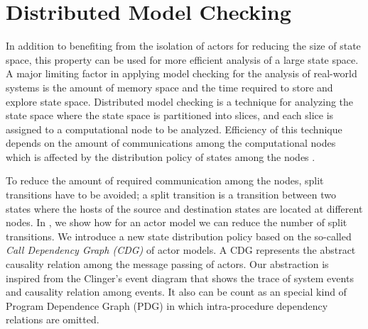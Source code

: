 \section{Distributed Model Checking} \label{sec::DMC}
In addition to benefiting from the isolation of actors for reducing the size of state space, this property can be used for more efficient analysis of a large state space. A major limiting factor in applying model checking for the analysis of real-world systems is the amount of memory space and the time required to store and explore state space. Distributed model checking is a technique for analyzing the state space
where the state space is partitioned into slices, and each slice is assigned to a computational node to be analyzed. Efficiency of this technique depends on the %
amount of communications among the computational nodes which is affected by the distribution policy of states among the nodes \cite{DBLP:journals/entcs/OrzanPE05}. 

To reduce the 
amount of required communication among the nodes, split transitions have to be avoided; a split transition is a transition between two states where the hosts of the source and destination states are located at different nodes. In \cite{DBLP:journals/eceasst/KhamespanahSMSR15}, we show how
for an actor model we can
reduce the number of split transitions. We introduce a new state distribution policy based on the so-called \textit{Call Dependency Graph (CDG)} of actor models. A CDG represents the abstract causality relation among %
the message passing of actors. Our abstraction is inspired from the Clinger's event diagram \cite{clinger} that shows the trace of system events and causality relation among events. It also can be count as an special kind of Program Dependence Graph (PDG) in which intra-procedure dependency relations are omitted. \cite{DBLP:conf/scam/Graf10}

